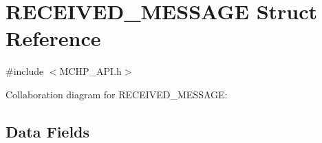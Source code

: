 \hypertarget{struct_r_e_c_e_i_v_e_d___m_e_s_s_a_g_e}{}\section{R\+E\+C\+E\+I\+V\+E\+D\+\_\+\+M\+E\+S\+S\+A\+G\+E Struct Reference}
\label{struct_r_e_c_e_i_v_e_d___m_e_s_s_a_g_e}


{\ttfamily \#include $<$M\+C\+H\+P\+\_\+\+A\+P\+I.\+h$>$}



Collaboration diagram for R\+E\+C\+E\+I\+V\+E\+D\+\_\+\+M\+E\+S\+S\+A\+G\+E\+:
\subsection*{Data Fields}
